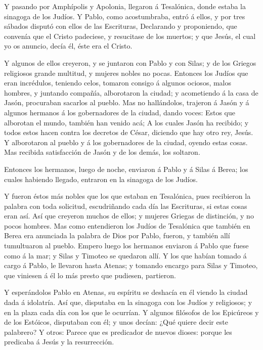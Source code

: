  Y pasando por Amphípolis y Apolonia, llegaron á Tesalónica,
donde estaba la sinagoga de los Judíos.  Y Pablo, como
acostumbraba, entró á ellos, y por tres sábados disputó con ellos de las
Escrituras,  Declarando y proponiendo, que convenía que el
Cristo padeciese, y resucitase de los muertos; y que Jesús, el cual yo
os anuncio, decía él, éste era el Cristo.

 Y algunos de ellos creyeron, y se juntaron con Pablo y con
Silas; y de los Griegos religiosos grande multitud, y mujeres nobles no
pocas.  Entonces los Judíos que eran incrédulos, teniendo
celos, tomaron consigo á algunos ociosos, malos hombres, y juntando
compañía, alborotaron la ciudad; y acometiendo á la casa de Jasón,
procuraban sacarlos al pueblo.  Mas no hallándolos, trajeron
á Jasón y á algunos hermanos á los gobernadores de la ciudad, dando
voces: Estos que alborotan el mundo, también han venido acá;
 A los cuales Jasón ha recibido; y todos estos hacen contra
los decretos de César, diciendo que hay otro rey, Jesús.  Y
alborotaron al pueblo y á los gobernadores de la ciudad, oyendo estas
cosas.  Mas recibida satisfacción de Jasón y de los demás,
los soltaron.

 Entonces los hermanos, luego de noche, enviaron á Pablo y
á Silas á Berea; los cuales habiendo llegado, entraron en la sinagoga de
los Judíos.

 Y fueron éstos más nobles que los que estaban en
Tesalónica, pues recibieron la palabra con toda solicitud, escudriñando
cada día las Escrituras, si estas cosas eran así.  Así que
creyeron muchos de ellos; y mujeres Griegas de distinción, y no pocos
hombres.  Mas como entendieron los Judíos de Tesalónica que
también en Berea era anunciada la palabra de Dios por Pablo, fueron, y
también allí tumultuaron al pueblo.  Empero luego los
hermanos enviaron á Pablo que fuese como á la mar; y Silas y Timoteo se
quedaron allí.  Y los que habían tomado á cargo á Pablo, le
llevaron hasta Atenas; y tomando encargo para Silas y Timoteo, que
viniesen á él lo más presto que pudiesen, partieron.

 Y esperándolos Pablo en Atenas, su espíritu se deshacía en
él viendo la ciudad dada á idolatría.  Así que, disputaba
en la sinagoga con los Judíos y religiosos; y en la plaza cada día con
los que le ocurrían.  Y algunos filósofos de los Epicúreos
y de los Estóicos, disputaban con él; y unos decían: ¿Qué quiere decir
este palabrero? Y otros: Parece que es predicador de nuevos dioses:
porque les predicaba á Jesús y la resurrección.

